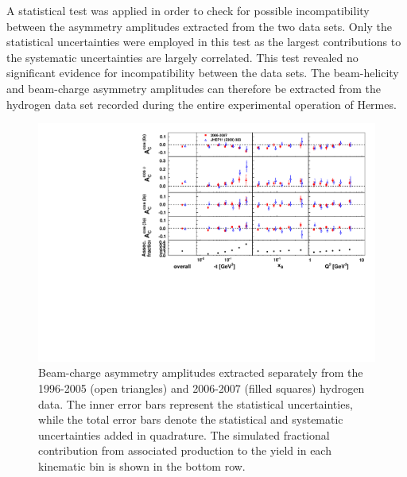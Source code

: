 A statistical test  was applied in order to check for possible incompatibility between the asymmetry amplitudes extracted from the two data sets. Only the statistical uncertainties were employed in this test as the largest contributions to the systematic uncertainties are largely correlated. This test revealed no significant evidence for incompatibility between the data sets. The beam-helicity and beam-charge asymmetry amplitudes can therefore be extracted from the  hydrogen data set recorded during the entire experimental operation of H{\sc ermes}.
\begin{figure}
\begin{center}
 \includegraphics[width=15cm,keepaspectratio]{bcaplots_eml_par13_bin6_pic_cluster_0607_9605_withassoc_dual}
  \caption{Beam-charge asymmetry amplitudes extracted separately from the 1996-2005 (open triangles) and 2006-2007 (filled squares) hydrogen data.
The inner error bars represent the statistical uncertainties, while the total error bars denote the statistical and systematic uncertainties added in quadrature. The simulated fractional contribution from associated production to the yield in each kinematic bin is shown in the bottom row.}
 \label{release_bca_0607}
\end{center}
 \end{figure}

